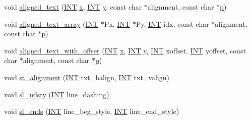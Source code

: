 \begin{DoxyCompactItemize}
\item 
void \mbox{\hyperlink{classmp__graphics_a52ca0d0e39640fe15c6a8bd8633c9e5a}{aligned\+\_\+text}} (\mbox{\hyperlink{galois_8h_a09fddde158a3a20bd2dcadb609de11dc}{I\+NT}} \mbox{\hyperlink{alphabet2_8_c_a6150e0515f7202e2fb518f7206ed97dc}{x}}, \mbox{\hyperlink{galois_8h_a09fddde158a3a20bd2dcadb609de11dc}{I\+NT}} \mbox{\hyperlink{alphabet2_8_c_a0a2f84ed7838f07779ae24c5a9086d33}{y}}, const char $\ast$alignment, const char $\ast$\mbox{\hyperlink{alphabet2_8_c_a533391314665d6bf1b5575e9a9cd8552}{p}})
\item 
void \mbox{\hyperlink{classmp__graphics_a19f2bd68d1090f43bb7b6567ad81b6b4}{aligned\+\_\+text\+\_\+array}} (\mbox{\hyperlink{galois_8h_a09fddde158a3a20bd2dcadb609de11dc}{I\+NT}} $\ast$Px, \mbox{\hyperlink{galois_8h_a09fddde158a3a20bd2dcadb609de11dc}{I\+NT}} $\ast$Py, \mbox{\hyperlink{galois_8h_a09fddde158a3a20bd2dcadb609de11dc}{I\+NT}} idx, const char $\ast$alignment, const char $\ast$\mbox{\hyperlink{alphabet2_8_c_a533391314665d6bf1b5575e9a9cd8552}{p}})
\item 
void \mbox{\hyperlink{classmp__graphics_a3b5a8558ee721bd8b9ed36e732317679}{aligned\+\_\+text\+\_\+with\+\_\+offset}} (\mbox{\hyperlink{galois_8h_a09fddde158a3a20bd2dcadb609de11dc}{I\+NT}} \mbox{\hyperlink{alphabet2_8_c_a6150e0515f7202e2fb518f7206ed97dc}{x}}, \mbox{\hyperlink{galois_8h_a09fddde158a3a20bd2dcadb609de11dc}{I\+NT}} \mbox{\hyperlink{alphabet2_8_c_a0a2f84ed7838f07779ae24c5a9086d33}{y}}, \mbox{\hyperlink{galois_8h_a09fddde158a3a20bd2dcadb609de11dc}{I\+NT}} xoffset, \mbox{\hyperlink{galois_8h_a09fddde158a3a20bd2dcadb609de11dc}{I\+NT}} yoffset, const char $\ast$alignment, const char $\ast$\mbox{\hyperlink{alphabet2_8_c_a533391314665d6bf1b5575e9a9cd8552}{p}})
\item 
void \mbox{\hyperlink{classmp__graphics_ab897ac847368de2da4296c7f159cc5f9}{st\+\_\+alignment}} (\mbox{\hyperlink{galois_8h_a09fddde158a3a20bd2dcadb609de11dc}{I\+NT}} txt\+\_\+halign, \mbox{\hyperlink{galois_8h_a09fddde158a3a20bd2dcadb609de11dc}{I\+NT}} txt\+\_\+valign)
\item 
void \mbox{\hyperlink{classmp__graphics_a66dd75ae04c9254e760ea479ee66946c}{sl\+\_\+udsty}} (\mbox{\hyperlink{galois_8h_a09fddde158a3a20bd2dcadb609de11dc}{I\+NT}} line\+\_\+dashing)
\item 
void \mbox{\hyperlink{classmp__graphics_a555d8a360035bd043aedba1563107551}{sl\+\_\+ends}} (\mbox{\hyperlink{galois_8h_a09fddde158a3a20bd2dcadb609de11dc}{I\+NT}} line\+\_\+beg\+\_\+style, \mbox{\hyperlink{galois_8h_a09fddde158a3a20bd2dcadb609de11dc}{I\+NT}} line\+\_\+end\+\_\+style)

\end{DoxyCompactItemize}
